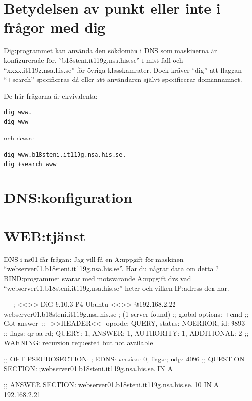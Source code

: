 \documentclass[swedish,10pt,a4paper]{report}
\begin{document}

\chapter{Betydelsen av punkt eller inte i frågor med dig}

Dig:programmet kan använda den sökdomän i DNS som maskinerna är konfigurerade för, ``b18steni.it119g.nsa.his.se'' i mitt fall och ``xxxx.it119g.nsa.his.se''
för övriga klasskamrater.
Dock kräver ``dig'' att flaggan ``+search'' specificeras då eller att användaren självt specificerar domännamnet.

De här frågorna är ekvivalenta:
\begin{verbatim}
dig www.
dig www
\end{verbatim}
och dessa:
\begin{verbatim}
dig www.b18steni.it119g.nsa.his.se.
dig +search www
\end{verbatim}

\chapter{DNS:konfiguration}\label{sec:dns_config}

\chapter{WEB:tjänst}\label{sec:httpd_config}

DNS i ns01 får frågan:
Jag vill få en A:uppgift för maskinen ``webserver01.b18steni.it119g.nsa.his.se''.
Har du någrar data om detta ?
BIND:programmet svarar med motsvarande A:uppgift dvs vad ``webserver01.b18steni.it119g.nsa.his.se''
heter och vilken IP:adress den har.

---
; <<>> DiG 9.10.3-P4-Ubuntu <<>> @192.168.2.22 webserver01.b18steni.it119g.nsa.his.se
; (1 server found)
;; global options: +cmd
;; Got answer:
;; ->>HEADER<<- opcode: QUERY, status: NOERROR, id: 9893
;; flags: qr aa rd; QUERY: 1, ANSWER: 1, AUTHORITY: 1, ADDITIONAL: 2
;; WARNING: recursion requested but not available

;; OPT PSEUDOSECTION:
; EDNS: version: 0, flags:; udp: 4096
;; QUESTION SECTION:
;webserver01.b18steni.it119g.nsa.his.se.	IN A

;; ANSWER SECTION:
webserver01.b18steni.it119g.nsa.his.se.	10 IN A	192.168.2.21
\end{document}
